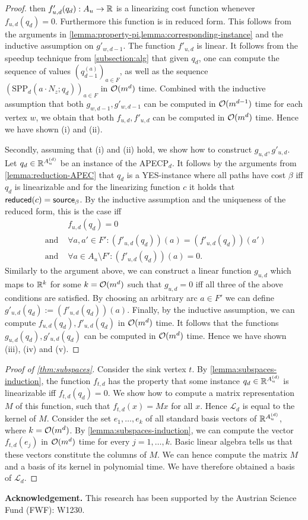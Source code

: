 \begin{proof}
    then $f'_{u,d}(q_d) : A_u \rightarrow \mathbb{R}$ is a linearizing cost function whenever $f_{u,d}(q_d) = 0$. Furthermore this function is in reduced form. This follows from the arguments in \cref{lemma:property-pi,lemma:corresponding-instance} and the inductive assumption on $g'_{w,d-1}$. 
    The function $f'_{u,d}$ is linear. 
    It follows from the speedup technique from \cref{subsection:alg} that given $q_d$, one can compute the sequence of values $(q^{(a)}_{d-1})_{a \in F}$, as well as the sequence $(\text{SPP}_d(a \cdot N_z; q_d))_{a\in F}$ in $\mathcal{O}(m^d)$ time. 
    Combined with the inductive assumption that both $g_{w,d-1}, g'_{w,d-1}$ can be computed in $\mathcal{O}(m^{d-1})$ time for each vertex $w$, we obtain that both $f_{u,d}, f'_{u,d}$ can be computed in $\mathcal{O}(m^d)$ time. Hence we have shown (i) and (ii).

    Secondly, assuming that (i) and (ii) hold, we show how to construct $g_{u,d}, g'_{u,d}$. Let $q_d \in \mathbb{R}^{A_u^{(d)}}$ be an instance of the APECP$_d$. It follows by the arguments from \cref{lemma:reduction-APEC} that $q_d$ is a YES-instance where all paths have cost $\beta$ iff $q_d$ is linearizable and for the linearizing function $c$ it holds that $\operatorname{\textsf{reduced}}(c) = \textsf{source}_\beta$. By the inductive assumption and the uniqueness of the reduced form, this is the case iff 
    \begin{align*}
        &f_{u,d}(q_d) = 0 \\
        \text{ and } &\forall a,a' \in F':  (f'_{u,d}(q_d))(a) = (f'_{u,d}(q_d))(a') \\
        \text{ and } &\forall a \in A_u \setminus F': (f'_{u,d}(q_d))(a) = 0. 
    \end{align*}
    Similarly to the argument above, we can construct a linear function $g_{u,d}$ which maps to $\mathbb{R}^k$ for some $k = \mathcal{O}(m^d)$ such that $g_{u,d} = 0$ iff all three of the above conditions are satisfied. By choosing an arbitrary arc $a \in F'$ we can define $g'_{u,d}(q_d) := (f'_{u,d}(q_d))(a)$. Finally, by the inductive assumption, we can compute $f_{u,d}(q_d), f'_{u,d}(q_d)$ in $\mathcal{O}(m^d)$ time. It follows that the functions $g_{u,d}(q_d), g'_{u,d}(q_d)$ can be computed in $\mathcal{O}(m^d)$ time. Hence we have shown (iii), (iv) and (v).  
\end{proof}

\begin{proof}[Proof of \cref{thm:subspaces}]
    Consider the sink vertex $t$. By \cref{lemma:subspaces-induction}, the function $f_{t,d}$ has the property that some instance $q_d \in \mathbb{R}^{A_u^{(d)}}$ is linearizable iff $f_{t,d}(q_d) = 0$. 
    We show how to compute a matrix representation $M$ of this function, such that $f_{t,d}(x) = Mx$ for all $x$. Hence $\mathcal{L}_d$ is equal to the kernel of $M$.
    Consider the set $e_1,\dots, e_k$ of all standard basis vectors of $\mathbb{R}^{A_u^{(d)}}$, where $k = \mathcal{O}(m^d)$. By \cref{lemma:subspaces-induction}, we can compute the vector $f_{t,d}(e_j)$ in $\mathcal{O}(m^d)$ time for every $j=1,\dots,k$. Basic linear algebra tells us that these vectors constitute the columns of $M$. We can hence compute the matrix $M$ and a basis of its kernel in polynomial time. We have therefore obtained a basis of $\mathcal{L}_d$.  
\end{proof}

\noindent \textbf{ Acknowledgement.} This research has been supported by the Austrian Science Fund (FWF): W1230.